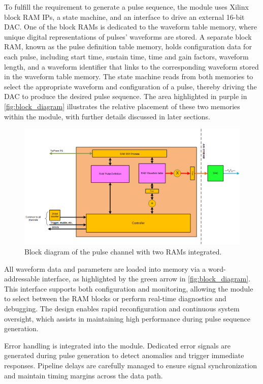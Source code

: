 To fulfill the requirement to generate a pulse sequence, the module uses Xilinx block RAM IPs, a state machine, and an interface to drive an external 16-bit DAC. One of the block RAMs is dedicated to the waveform table memory, where unique digital representations of pulses' waveforms are stored. A separate block RAM, known as the pulse definition table memory, holds configuration data for each pulse, including start time, sustain time, time and gain factors, waveform length, and a waveform identifier that links to the corresponding waveform stored in the waveform table memory. The state machine reads from both memories to select the appropriate waveform and configuration of a pulse, thereby driving the DAC to produce the desired pulse sequence. The area highlighted in purple in \autoref{fig:block_diagram} illustrates the relative placement of these two memories within the module, with further details discussed in later sections.

\begin{figure}[h]
    \centering
    \includegraphics[width=1.0\linewidth]{figures/3.1.png}
    \caption{Block diagram of the pulse channel with two RAMs integrated.}
    \label{fig:block_diagram}
\end{figure}

All waveform data and parameters are loaded into memory via a word-addressable interface, as highlighted by the green arrow in \autoref{fig:block_diagram}. This interface supports both configuration and monitoring, allowing the module to select between the RAM blocks or perform real‐time diagnostics and debugging. The design enables rapid reconfiguration and continuous system oversight, which assists in maintaining high performance during pulse sequence generation.

Error handling is integrated into the module. Dedicated error signals are generated during pulse generation to detect anomalies and trigger immediate responses. Pipeline delays are carefully managed to ensure signal synchronization and maintain timing margins across the data path.

